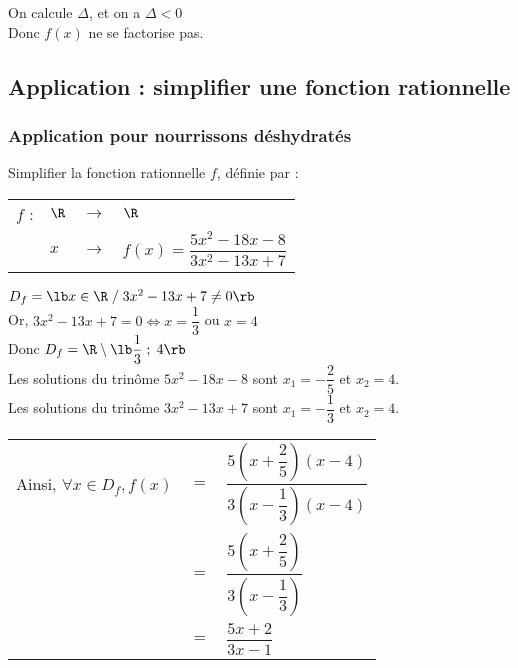 On calcule $\Delta$, et on a $\Delta < 0$ \\

Donc $f\left(x\right)$ ne se factorise pas. 

\newpage

\vspace*{-2cm}

\subsection{Application : simplifier une fonction rationnelle}

\subsubsection{Application pour nourrissons déshydratés}

Simplifier la fonction rationnelle $f$, définie par :

\begin{tabular}{llll}
$f$ : & $\R$ & $\longrightarrow$ & $\R$ \\
& $x$ & $\longrightarrow$ & $f\left(x\right) = \dfrac{5x^2 - 18x - 8}{3x^2 - 13x + 7}$\\ 
\end{tabular}

$D_f = \lb x\in \R \; / \; 3x^2 - 13x + 7 \neq 0 \rb $ \\

Or, $3x^2 - 13x + 7 = 0 \Longleftrightarrow x = \dfrac{1}{3}$ ou $ x = 4$ \\

Donc $D_f = \R \setminus \lb \dfrac{1}{3} \; ; \; 4 \rb $ \\

Les solutions du trinôme $5x^2 - 18x - 8$ sont $x_1 = -\dfrac{2}{5}$ et $x_2 = 4$. \\

Les solutions du trinôme $3x^2 - 13x + 7$ sont $x_1 = -\dfrac{1}{3}$ et $x_2 = 4$. \\

\begin{tabular}{lll}
Ainsi, $\forall x \in D_f, f\left(x\right)$ & $=$ &$ \dfrac{5\left(x + \dfrac{2}{5}\right)\left(x-4\right)}{3\left(x-\dfrac{1}{3}\right)\left(x-4\right)}$ \\
& $=$ & $\dfrac{5\left(x + \dfrac{2}{5}\right)}{3\left(x-\dfrac{1}{3}\right)}$ \\
& $=$ & $\dfrac{5x + 2}{3x - 1}$ \\
\end{tabular}

